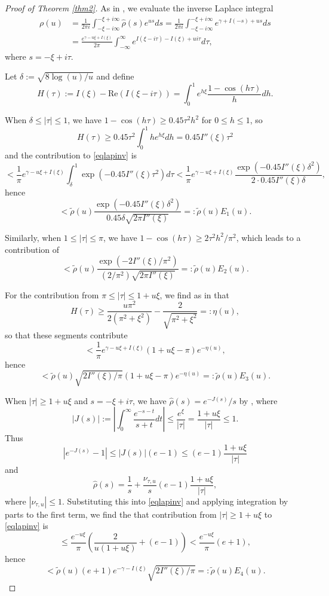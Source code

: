 \documentclass[11pt]{amsart}
\begin{document}
\begin{proof}[Proof of Theorem \ref{thm2}]

As in \cite{Ten}, we evaluate the inverse Laplace integral
\begin{equation}\label{eqlapinv}
\begin{split}
\rho(u) & =\frac{1}{2\pi i} \int_{-\xi-i\infty}^{-\xi+i\infty} \widehat{\rho}(s) e^{us} ds
=\frac{1}{2\pi i} \int_{-\xi-i\infty}^{-\xi+i\infty}  e^{\gamma + I(-s)+ us} ds \\
& =\frac{e^{\gamma-u\xi + I(\xi)}}{2\pi} \int_{-\infty}^{\infty} e^{I(\xi-i\tau)-I(\xi)+ui\tau} d\tau,
\end{split}
\end{equation}
where $s=-\xi+i\tau$. 

Let $\delta:= \sqrt{8\log(u)/u}$
and define
$$
H(\tau):=I(\xi)-\mathrm{Re}(I(\xi-i\tau)) =\int_0^1 e^{h\xi} \frac{1-\cos(h\tau)}{h} dh.
$$

When $\delta\le |\tau| \le 1$, we have $1-\cos(h\tau)\ge 0.45 \tau^2 h^2$ for $0\le h\le 1$, so
$$H(\tau) \ge 0.45\tau^2 \int_0^1 h e^{h\xi} dh = 0.45 I''(\xi) \tau^2$$
and the contribution to \eqref{eqlapinv} is
$$
< \frac{1}{\pi} e^{\gamma-u\xi + I(\xi)} \int_\delta^1 \exp(-0.45 I''(\xi) \tau^2)d\tau 
< \frac{1}{\pi} e^{\gamma-u\xi + I(\xi)} \frac{\exp(-0.45 I''(\xi)\delta^2)}{2\cdot 0.45 I''(\xi)\delta},
$$
hence
$$
<  \tilde{\rho}(u)  \frac{\exp(-0.45 I''(\xi)\delta^2)}{0.45 \delta \sqrt{2 \pi I''(\xi)}} =: \tilde{\rho}(u) E_1(u).
$$

Similarly, when $1 \le |\tau| \le \pi$, we have $1-\cos(h\tau) \ge 2\tau^2 h^2/\pi^2$, which leads to a contribution of
$$
<  \tilde{\rho}(u)  \frac{\exp(-2I''(\xi)/\pi^2)}{(2/\pi^2) \sqrt{2 \pi I''(\xi)}} =: \tilde{\rho}(u) E_2(u).
$$

For the contribution from $\pi \le |\tau| \le 1+u\xi$, we find as in \cite{Ten} that
$$
H(\tau)\ge \frac{u \pi^2}{2(\pi^2+\xi^2)}-\frac{2}{\sqrt{\pi^2+\xi^2}}=: \eta(u),
$$
so that these segments contribute
$$
<\frac{1}{\pi} e^{\gamma-u\xi + I(\xi)} (1+u\xi-\pi) e^{-\eta(u)},
$$
hence
$$
< \tilde{\rho}(u) \sqrt{2I''(\xi)/\pi} (1+u\xi-\pi) e^{-\eta(u)}=: \tilde{\rho}(u) E_3(u).
$$


When $|\tau|\ge 1 +u\xi$ and $s=-\xi+i\tau$, we have $\widehat{\rho}(s)=e^{-J(s)}/s$ by \cite[(5.51)]{Ten}, where 
$$
|J(s)| := \left|\int_0^\infty \frac{e^{-s-t}}{s+t} dt \right|\le \frac{e^{\xi}}{|\tau|}=\frac{1+u\xi}{|\tau|} \le 1.
$$ 
Thus
$$
|e^{-J(s)}-1| \le |J(s)| (e-1) \le (e-1)\frac{1+u\xi}{|\tau|}
$$
and
$$
\widehat{\rho}(s) = \frac{1}{s}+ \frac{\nu_{\tau,u}}{s}(e-1) \frac{1+u\xi}{|\tau|},
$$
where $|\nu_{\tau,u}|\le 1$.
Substituting this into \eqref{eqlapinv} and applying integration by parts to the first term, 
we find the that contribution from $|\tau|\ge 1 +u\xi$ to \eqref{eqlapinv} is 
$$
\le \frac{e^{-u\xi}}{\pi}\left(\frac{2}{u(1+u\xi)}+(e-1)\right) < \frac{e^{-u\xi}}{\pi}(e+1),
$$
hence
$$
< \tilde{\rho}(u) (e+1)e^{-\gamma-I(\xi)} \sqrt{2I''(\xi)/\pi} =: \tilde{\rho}(u) E_4(u).
$$



\end{proof}
\end{document}
